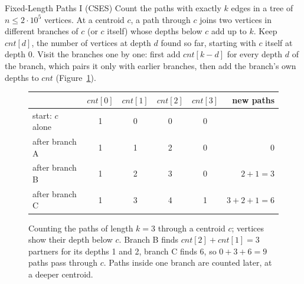 \begin{problem}{Fixed-Length Paths I (CSES)}
Count the paths with exactly $k$ edges in a tree of $n \le 2 \cdot 10^5$ vertices.
\solution At a centroid $c$, a path through $c$ joins two vertices in different branches of $c$ (or $c$ itself) whose depths below
$c$ add up to $k$. Keep $\mathit{cnt}[d]$, the number of vertices at depth $d$ found so far, starting with $c$ itself at depth
0. Visit the branches one by one: first add $\mathit{cnt}[k - d]$ for every depth $d$ of the branch, which pairs it only with
earlier branches, then add the branch's own depths to $\mathit{cnt}$ (Figure~\ref{fig:fixedlen}).
\end{problem}

\begin{figure}[htbp]
\centering
\begin{minipage}[c]{4.1cm}\centering
{}
\end{minipage}
\hspace{4mm}
\begin{minipage}[c]{10.2cm}\centering\small
\begin{tabular}{@{}lccccr@{}}
\toprule
 & $\mathit{cnt}[0]$ & $\mathit{cnt}[1]$ & $\mathit{cnt}[2]$ & $\mathit{cnt}[3]$ & new paths \\
\midrule
start: $c$ alone & 1 & 0 & 0 & 0 & \\
after branch A & 1 & 1 & 2 & 0 & 0 \\
after branch B & 1 & 2 & 3 & 0 & $2 + 1 = 3$ \\
after branch C & 1 & 3 & 4 & 1 & $3 + 2 + 1 = 6$ \\
\bottomrule
\end{tabular}
\end{minipage}
\caption{Counting the paths of length $k = 3$ through a centroid $c$; vertices show their depth below $c$. Branch B finds
$\mathit{cnt}[2] + \mathit{cnt}[1] = 3$ partners for its depths 1 and 2, branch C finds 6, so $0 + 3 + 6 = 9$ paths pass through
$c$. Paths inside one branch are counted later, at a deeper centroid.}
\label{fig:fixedlen}
\end{figure}

